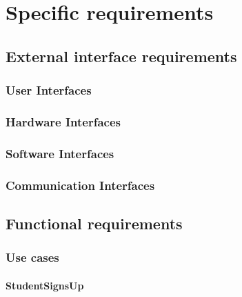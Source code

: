 \chapter{Specific requirements}

\section{External interface requirements}
\subsection{User Interfaces}
\subsection{Hardware Interfaces}
\subsection{Software Interfaces}
\subsection{Communication Interfaces}

\section{Functional requirements}

\subsection{Use cases}

\subsubsection{StudentSignsUp}

